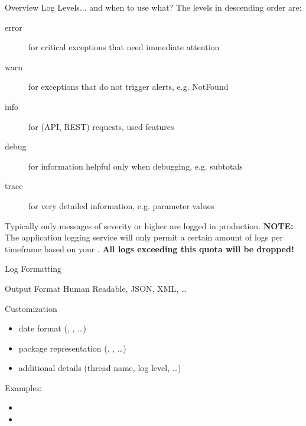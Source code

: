 \begin{frame}[fragile]{Overview Log Levels}{... and when to use what?}
    The levels in descending order are:
    \begin{description}
        \item[error] for critical exceptions that need immediate attention
        \item[warn] for exceptions that do not trigger alerts, e.g. NotFound
        \item[info] for (API, REST) requests, used features
        \item[debug] for information helpful only when debugging, e.g. subtotals
        \item[trace] for very detailed information, e.g. parameter values
    \end{description}

    \vfill
    Typically only messages of severity  or higher are logged in production.
    \vfill
    \textbf{NOTE:} The application logging service will only permit a certain amount of logs per timeframe based on your .
   \textbf{All logs exceeding this quota will be dropped!}
\end{frame}

\begin{frame}{Log Formatting}
\begin{block}{Output Format}
Human Readable, JSON, XML, \ldots
\end{block}

\begin{block}{Customization}
        \begin{itemize}
            \item date format (, , \ldots)
            \item package representation (, , \ldots)
            \item additional details (thread name, log level, \ldots)
        \end{itemize}
\end{block}
Examples:
{\footnotesize
\begin{itemize}
    \item {}
    \item {}
\end{itemize}
}
\end{frame}

